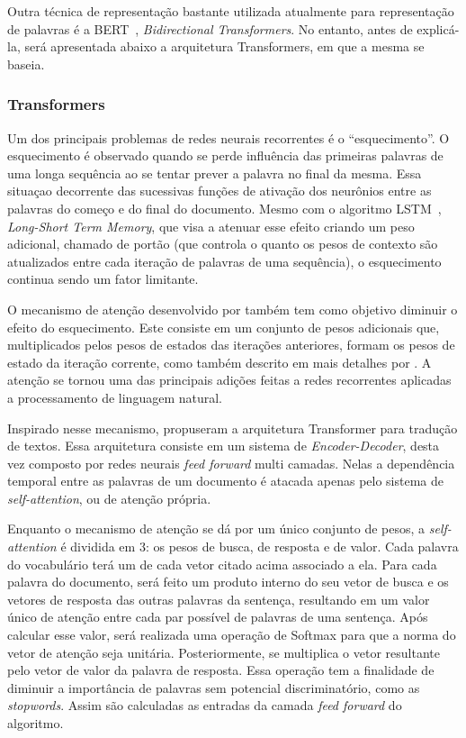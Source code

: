 Outra técnica de representação bastante utilizada atualmente para representação
de palavras é a BERT~\cite{devlin18}, \textit{Bidirectional Transformers}.
No entanto, antes de explicá-la, será apresentada abaixo a arquitetura
Transformers, em que a mesma se baseia.

\subsubsection{Transformers}

Um dos principais problemas de redes neurais recorrentes é o ``esquecimento''.
O esquecimento é observado quando se perde influência das primeiras palavras de
uma longa sequência ao se tentar prever a palavra no final da mesma.
Essa situaçao decorrente das sucessivas funções de ativação dos neurônios entre
as palavras do começo e do final do documento.
Mesmo com o algoritmo LSTM~\cite{hochreiter97}, \textit{Long-Short Term Memory},
que visa a atenuar esse efeito criando um peso adicional, chamado de portão (que
controla o quanto os pesos de contexto são atualizados entre cada iteração de
palavras de uma sequência), o esquecimento continua sendo um fator limitante.

O mecanismo de atenção desenvolvido por \citet{bahdanau14} também tem como
objetivo diminuir o efeito do esquecimento.
Este consiste em um conjunto de pesos adicionais que, multiplicados pelos pesos
de estados das iterações anteriores, formam os pesos de estado da iteração
corrente, como também descrito em mais detalhes por \citet{luong15}.
A atenção se tornou uma das principais adições feitas a redes recorrentes
aplicadas a processamento de linguagem natural.


Inspirado nesse mecanismo, \citet{vaswani17} propuseram a arquitetura
Transformer para tradução de textos.
Essa arquitetura consiste em um sistema de \textit{Encoder-Decoder}, desta vez
composto por redes neurais \textit{feed forward} multi camadas.
Nelas a dependência temporal entre as palavras de um documento é atacada apenas
pelo sistema de \textit{self-attention}, ou de atenção própria.

Enquanto o mecanismo de atenção se dá por um único conjunto de pesos, a
\textit{self-attention} é dividida em 3: os pesos de busca, de resposta e de
valor.
Cada palavra do vocabulário terá um de cada vetor citado acima associado a ela.
Para cada palavra do documento, será feito um produto interno do seu vetor de
busca e os vetores de resposta das outras palavras da sentença, resultando em um
valor único de atenção entre cada par possível de palavras de uma sentença.
Após calcular esse valor, será realizada uma operação de Softmax para que a norma
do vetor de atenção seja unitária.
Posteriormente, se multiplica o vetor resultante pelo vetor de valor da palavra
de resposta.
Essa operação tem a finalidade de diminuir a importância de palavras sem
potencial discriminatório, como as \textit{stopwords}.
Assim são calculadas as entradas da camada \textit{feed forward} do algoritmo.

